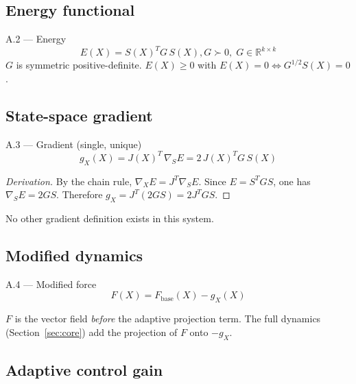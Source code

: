 \documentclass[11pt,oneside]{amsart}
\def\qquad{ }%
\def\textbf#1{#1}%
\theoremstyle{plain}
\theoremstyle{definition}
\newcommand{\gX}{g_X}
\newcommand{\Fbase}{F_{\mathrm{base}}}
\newcommand{\R}{\mathbb{R}}
\begin{document}
\subsection{Energy functional}
\label{sec:energy}

\begin{defbox}{A.2 --- Energy}
\[
\boxed{E(X) = S(X)^{T} G\, S(X), \qquad G \succ 0,\; G \in \R^{k\times k}}
\]
$G$ is symmetric positive-definite.
$E(X) \geq 0$ with $E(X) = 0 \iff G^{1/2}S(X) = 0$.
\end{defbox}

\subsection{State-space gradient}
\label{sec:gradient}

\begin{defbox}{A.3 --- Gradient (single, unique)}
\[
\boxed{\gX(X) = J(X)^{T}\,\nabla_{S} E = 2\,J(X)^{T} G\, S(X)}
\]
\end{defbox}

\begin{proof}[Derivation]
By the chain rule,
$\nabla_{X} E = J^{T} \nabla_{S} E$.
Since $E = S^{T}GS$, one has $\nabla_{S} E = 2GS$.
Therefore $\gX = J^{T}(2GS) = 2J^{T}GS$.
\end{proof}

\noindent \textbf{No other gradient definition exists in this system.}

\subsection{Modified dynamics}
\label{sec:dynamics}

\begin{defbox}{A.4 --- Modified force}
\[
\boxed{F(X) = \Fbase(X) - \gX(X)}
\]
\end{defbox}

$F$ is the vector field \emph{before} the adaptive projection term.
The full dynamics (Section~\ref{sec:core}) add the projection of $F$ onto
$-\gX$.

\subsection{Adaptive control gain}
\label{sec:control}
\end{document}
